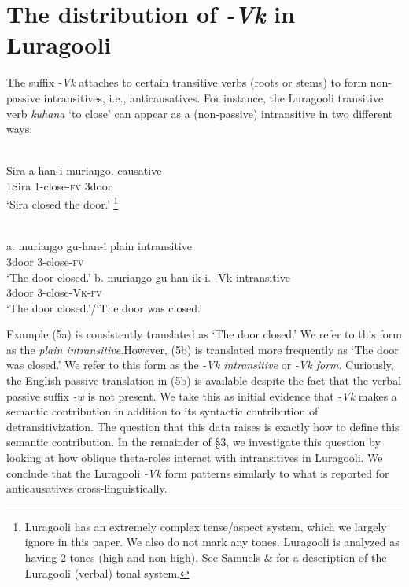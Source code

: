 \documentclass[output=paper]{langsci/langscibook}
\begin{document}
\section{The distribution of \textit{-Vk} in Luragooli}

The suffix \textit{-Vk} attaches to certain transitive verbs (roots or stems) to form non-passive intransitives, i.e., anticausatives. For instance, the Luragooli transitive verb \textit{kuhana} ‘to close’ can appear as a (non-passive) intransitive in two different ways:

\ea\label{exx:}
\ea
{}\\
\gll Sira    a-han-i      muriaŋgo.      causative\\
     1Sira 1-close-\textsc{fv}  3door\\
\glt ‘Sira closed the door.’
\footnote{ Luragooli has an extremely complex tense/aspect system, which we largely ignore in this paper. We also do not mark any tones. Luragooli is analyzed as having 2 tones (high and non-high). See Samuels \& \citet{Paster2015} for a description of the Luragooli (verbal) tonal system.}
\z
\z

\ea\label{exx:}
{}\\
\ea
\gll a. muriaŋgo gu-han-i        plain intransitive\\
       3door       3-close-\textsc{fv}\\
\glt ‘The door closed.’
\ex
\gll b. muriaŋgo gu-han-ik-i.      -\textup{Vk} intransitive\\
       3door         3-close-\textsc{Vk}-\textsc{fv}\\
\glt ‘The door closed.’/‘The door was closed.’
\z
\z

Example (5a) is consistently translated as ‘The door closed.’ We refer to this form as the \textit{plain intransitive}.However, (5b) is translated more frequently as ‘The door was closed.’ We refer to this form as the \textit{-Vk intransitive} or \textit{-Vk form}. Curiously, the English passive translation in (5b) is available despite the fact that the verbal passive suffix \textit{-w }is not present. We take this as initial evidence that \textit{-Vk} makes a semantic contribution in addition to its syntactic contribution of detransitivization. The question that this data raises is exactly how to define this semantic contribution.\textit{ }In the remainder of §3, we investigate this question by looking at how oblique theta-roles interact with intransitives in Luragooli. We conclude that the Luragooli \textit{-Vk} form patterns similarly to what is reported for anticausatives cross-linguistically.
\end{document}
